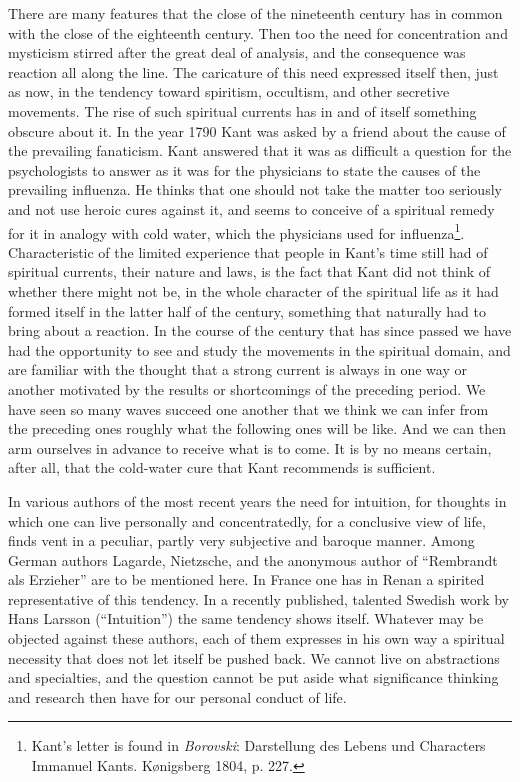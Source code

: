 \documentclass[12pt,a4paper,openany]{book}
\newcommand{\opage}[1]{\marginnote{\footnotesize\textit{[#1]}}}
\begin{document}
There are many features that the close of the nineteenth
century has in common with the close of the eighteenth century.
Then too the need for concentration and mysticism stirred after
the great deal of analysis, and the consequence was reaction all along the line.
The caricature of this need expressed itself then, just as now, in
the tendency toward spiritism, occultism, and other
secretive movements. The rise of such spiritual currents
has in and of itself something obscure about it. In the year 1790
Kant was asked by a friend about the cause of the prevailing
fanaticism. Kant answered that it was as difficult a
question for the psychologists to answer as it was for the physicians
to state the causes of the prevailing influenza. He
thinks that one should not take the matter too seriously and not
use heroic cures against it, and seems to conceive of a
spiritual remedy for it in analogy with cold water, which
the physicians used for influenza\footnote{Kant's letter is found in \emph{Borovski}: Darstellung des Lebens und
Characters Immanuel Kants. Kønigsberg 1804, p. 227.}. Characteristic of the
limited experience that people in Kant's time still had of
spiritual currents, their nature and laws, is the fact that Kant
did not think of whether there might not be, in the whole character
of the spiritual life as it had formed itself in the latter half of
the century, something that naturally had to
bring about a reaction. In the course of the century that
has since passed we have had the opportunity to see and study the
movements in the spiritual domain, and are familiar with the
thought that a strong current is always in one way or another
motivated by the results or shortcomings of the preceding period.
We have seen so many waves succeed one another that
we think we can infer from the preceding ones roughly what
the following ones will be like. And we can then arm ourselves in
advance to receive what is to come. It
\opage{183}is by no means certain, after all, that the cold-water cure that Kant recommends is
sufficient.

In various authors of the most recent years the
need for intuition, for thoughts in which one can live
personally and concentratedly, for a conclusive view of life, finds vent
in a peculiar, partly very subjective and baroque manner.
Among German authors Lagarde, Nietzsche, and the anonymous
author of ``Rembrandt als Erzieher'' are to be mentioned here. In
France one has in Renan a spirited representative of this
tendency. In a recently published, talented Swedish work by Hans
Larsson (``Intuition'') the same tendency shows itself. Whatever
may be objected against these authors, each of them expresses
in his own way a spiritual necessity that does not
let itself be pushed back. We cannot live on abstractions
and specialties, and the question cannot be put aside
what significance thinking and research then have for our
personal conduct of life.
\end{document}
